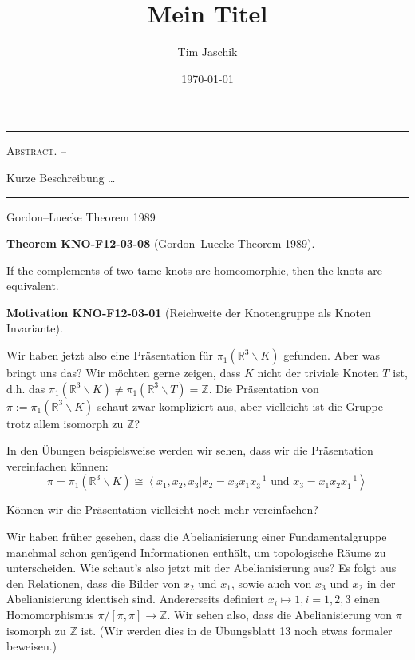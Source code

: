 \documentclass[10pt, letterpaper]{article}
\title{Mein Titel}
\author{Tim Jaschik}
\date{\today}
\renewenvironment{abstract}
  {
    \begin{adjustwidth}{1.5cm}{1.5cm}
    \small
    \textsc{Abstract. –}%
  }
  {
    \end{adjustwidth}
  }
\newcommand{\CustomHeading}[3]{%
  \par\medskip\noindent%
  \textbf{#1 #2} \textnormal{(#3)}.\enskip%
}
\newenvironment{THEO}[2]{\begin{unitbox}\CustomHeading{Theorem}{#1}{#2}}{\end{unitbox}}
\newenvironment{MOT}[2]{\begin{unitbox}\CustomHeading{Motivation}{#1}{#2}}{\end{unitbox}}
\begin{document}
\maketitle
\rule{\textwidth}{0.5pt}
\begin{abstract}
Kurze Beschreibung …
\end{abstract}
\rule{\textwidth}{0.5pt}
\vspace{0.5cm}

\tableofcontents

\pagebreak


Gordon–Luecke Theorem 1989

\begin{THEO}{KNO-F12-03-08}{Gordon–Luecke Theorem 1989}
If the complements of two tame knots are homeomorphic, then the knots are equivalent.
\end{THEO}



\begin{MOT}{KNO-F12-03-01}{Reichweite der Knotengruppe als Knoten Invariante}
Wir haben jetzt also eine Präsentation für $\pi_1\left(\mathbb{R}^3 \backslash K\right)$ gefunden. Aber was bringt uns das? Wir möchten gerne zeigen, dass $K$ nicht der triviale Knoten $T$ ist, d.h. das $\pi_1\left(\mathbb{R}^3 \backslash K\right) \neq \pi_1\left(\mathbb{R}^3 \backslash T\right)=\mathbb{Z}$. Die Präsentation von $\pi:=\pi_1\left(\mathbb{R}^3 \backslash K\right)$ schaut zwar kompliziert aus, aber vielleicht ist die Gruppe trotz allem isomorph zu $\mathbb{Z}$?
\end{MOT}


In den Übungen beispielsweise werden wir sehen, dass wir die Präsentation vereinfachen können:
$$
\left.\pi=\pi_1\left(\mathbb{R}^3 \backslash K\right) \cong\left\langle x_1, x_2, x_3\right| x_2=x_3 x_1 x_3^{-1} \text { und } x_3=x_1 x_2 x_1^{-1}\right\rangle
$$

Können wir die Präsentation vielleicht noch mehr vereinfachen?


Wir haben früher gesehen, dass die Abelianisierung einer Fundamentalgruppe manchmal schon genügend Informationen enthält, um topologische Räume zu unterscheiden. Wie schaut's also jetzt mit der Abelianisierung aus? Es folgt aus den Relationen, dass die Bilder von $x_2$ und $x_1$, sowie auch von $x_3$ und $x_2$ in der Abelianisierung identisch sind. Andererseits definiert $x_i \mapsto 1, i=1,2,3$ einen Homomorphismus $\pi /[\pi, \pi] \rightarrow \mathbb{Z}$. Wir sehen also, dass die Abelianisierung von $\pi$ isomorph zu $\mathbb{Z}$ ist. (Wir werden dies in de Übungsblatt 13 noch etwas formaler beweisen.)
\end{document}
